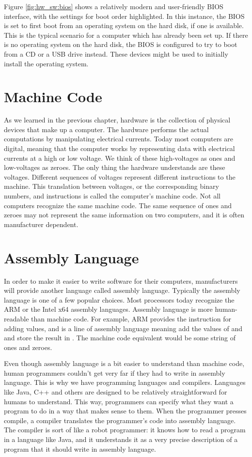 Figure \ref{fig:hw_sw:bios} shows a relatively modern and user-friendly BIOS interface, with the settings for boot order highlighted. In this instance, the BIOS is set to first boot from an operating system on the hard disk, if one is available. This is the typical scenario for a computer which has already been set up. If there is no operating system on the hard disk, the BIOS is configured to try to boot from a CD or a USB drive instead. These devices might be used to initially install the operating system.

\section{Machine Code}

As we learned in the previous chapter, hardware is the collection of physical devices that make up a computer. The hardware performs the actual computations by manipulating electrical currents. Today most computers are digital, meaning that the computer works by representing data with electrical currents at a high or low voltage. We think of these high-voltages as ones and low-voltages as zeroes. The only thing the hardware understands are these voltages. Different sequences of voltages represent different instructions to the machine. This translation between voltages, or the corresponding binary numbers, and instructions is called the computer's machine code. Not all computers recognize the same machine code. The same sequence of ones and zeroes may not represent the same information on two computers, and it is often manufacturer dependent.

\section{Assembly Language}

In order to make it easier to write software for their computers, manufacturers will provide another language called assembly language. Typically the assembly language is one of a few popular choices. Most processors today recognize the ARM or the Intel x64 assembly languages. Assembly language is more human-readable than machine code. For example, ARM provides the instruction  for adding values, and  is a line of assembly language meaning add the values of  and  and store the result in . The machine code equivalent would be some string of ones and zeroes.

Even though assembly language is a bit easier to understand than machine code, human programmers couldn't get very far if they had to write in assembly language. This is why we have programming languages and compilers. Languages like Java, C++ and others are designed to be relatively straightforward for humans to understand. This way, programmers can specify what they want a program to do in a way that makes sense to them. When the programmer presses compile, a compiler translates the programmer's code into assembly language. The compiler is sort of like a robot programmer: it knows how to read a program in a language like Java, and it understands it as a very precise description of a program that it should write in assembly language. 

